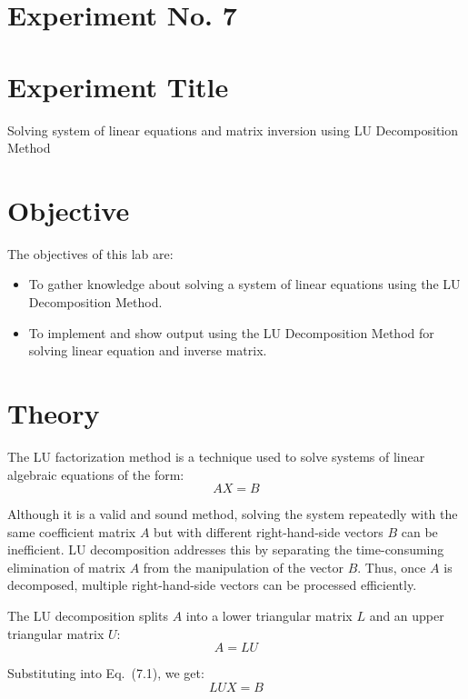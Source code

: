 \documentclass[a4paper,12pt]{article}
\begin{document}
	\section{Experiment No. 7}
	
	\section{Experiment Title }
	Solving system of linear equations and matrix inversion using LU Decomposition Method
	\section{Objective}
	
	The objectives of this lab are:
	\begin{itemize}
		\item To gather knowledge about solving a system of linear equations using the LU Decomposition Method.
		\item To implement and show output using the  LU Decomposition Method for solving linear equation and inverse matrix.
		
	\end{itemize}
	
\section{Theory}

The LU factorization method is a technique used to solve systems of linear algebraic equations of the form:
\begin{equation}
	AX = B \tag{7.1}
\end{equation}

Although it is a valid and sound method, solving the system repeatedly with the same coefficient matrix \( A \) but with different right-hand-side vectors \( B \) can be inefficient. LU decomposition addresses this by separating the time-consuming elimination of matrix \( A \) from the manipulation of the vector \( B \). Thus, once \( A \) is decomposed, multiple right-hand-side vectors can be processed efficiently.

The LU decomposition splits \( A \) into a lower triangular matrix \( L \) and an upper triangular matrix \( U \):
\begin{equation}
	A = LU \tag{7.2}
\end{equation}

Substituting into Eq.~(7.1), we get:
\begin{equation}
	LUX = B \tag{7.3}
\end{equation}
\end{document}
